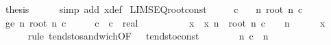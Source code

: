 \begin{isabellebody}
\ {\isacharquery}{\kern0pt}thesis\isanewline
\ \ \ \ \isamarkupfalse%
\ {\isacharparenleft}{\kern0pt}simp\ add{\isacharcolon}{\kern0pt}\ x{\isacharunderscore}{\kern0pt}def{\isacharparenright}{\kern0pt}\isanewline
{}\isamarkupfalse%
%
\endisatagproof
{\isafoldproof}%
%
\isadelimproof
\isanewline
%
\endisadelimproof
\isanewline
{}\isamarkupfalse%
\ LIMSEQ{\isacharunderscore}{\kern0pt}root{\isacharunderscore}{\kern0pt}const{\isacharcolon}{\kern0pt}\isanewline
\ \ \ {\isachardoublequoteopen}{}\ {\isacharless}{\kern0pt}\ c{\isachardoublequoteclose}\isanewline
\ \ \ {\isachardoublequoteopen}{\isacharparenleft}{\kern0pt}{\isasymlambda}n{\isachardot}{\kern0pt}\ root\ n\ c{\isacharparenright}{\kern0pt}\ {\isasymlonglonglongrightarrow}\ {}{\isachardoublequoteclose}\isanewline
%
\isadelimproof
%
\endisadelimproof
%
\isatagproof
{}\isamarkupfalse%
\ {\isacharminus}{\kern0pt}\isanewline
\ \ \isamarkupfalse%
\ ge{\isacharunderscore}{\kern0pt}{}{\isacharcolon}{\kern0pt}\ {\isachardoublequoteopen}{\isacharparenleft}{\kern0pt}{\isasymlambda}n{\isachardot}{\kern0pt}\ root\ n\ c{\isacharparenright}{\kern0pt}\ {\isasymlonglonglongrightarrow}\ {}{\isachardoublequoteclose}\ \ {\isachardoublequoteopen}{}\ {\isasymle}\ c{\isachardoublequoteclose}\ \ c\ {\isacharcolon}{\kern0pt}{\isacharcolon}{\kern0pt}\ real\isanewline
\ \ \isamarkupfalse%
\ {\isacharminus}{\kern0pt}\isanewline
\ \ \ \ \isamarkupfalse%
\ x\ \ {\isachardoublequoteopen}x\ n\ {\isacharequal}{\kern0pt}\ root\ n\ c\ {\isacharminus}{\kern0pt}\ {}{\isachardoublequoteclose}\ \ n\isanewline
\ \ \ \ \isamarkupfalse%
\ {\isachardoublequoteopen}x\ {\isasymlonglonglongrightarrow}\ {}{\isachardoublequoteclose}\isanewline
\ \ \ \ \isamarkupfalse%
\ {\isacharparenleft}{\kern0pt}rule\ tendsto{\isacharunderscore}{\kern0pt}sandwich{\isacharbrackleft}{\kern0pt}OF\ {\isacharunderscore}{\kern0pt}\ {\isacharunderscore}{\kern0pt}\ tendsto{\isacharunderscore}{\kern0pt}const{\isacharbrackright}{\kern0pt}{\isacharparenright}{\kern0pt}\isanewline
\ \ \ \ \ \ \isamarkupfalse%
\ {\isachardoublequoteopen}{\isacharparenleft}{\kern0pt}{\isasymlambda}n{\isachardot}{\kern0pt}\ c\ {\isacharslash}{\kern0pt}\ n{\isacharparenright}{\kern0pt}\ {\isasymlonglonglongrightarrow}\ {}{\isachardoublequoteclose}\isanewline

\end{isabellebody}
